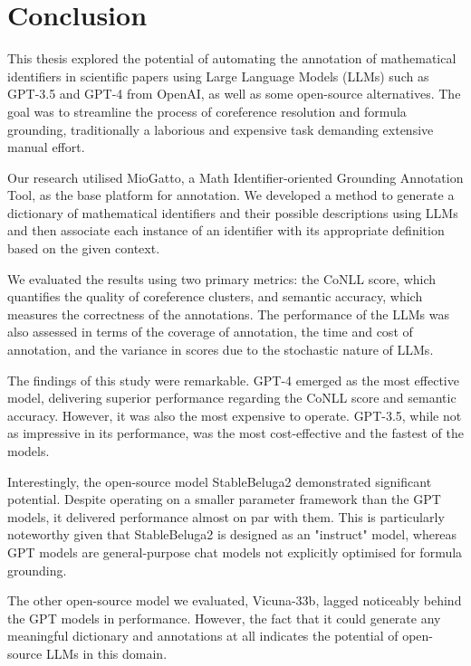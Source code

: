 \chapter{Conclusion}\label{chapter:conclusion}

This thesis explored the potential of automating the annotation of mathematical identifiers in scientific papers using Large Language Models (LLMs) such as GPT-3.5 and GPT-4 from OpenAI, as well as some open-source alternatives. The goal was to streamline the process of coreference resolution and formula grounding, traditionally a laborious and expensive task demanding extensive manual effort. 

Our research utilised MioGatto, a Math Identifier-oriented Grounding Annotation Tool, as the base platform for annotation. We developed a method to generate a dictionary of mathematical identifiers and their possible descriptions using LLMs and then associate each instance of an identifier with its appropriate definition based on the given context. 

We evaluated the results using two primary metrics: the CoNLL score, which quantifies the quality of coreference clusters, and semantic accuracy, which measures the correctness of the annotations. The performance of the LLMs was also assessed in terms of the coverage of annotation, the time and cost of annotation, and the variance in scores due to the stochastic nature of LLMs. 

The findings of this study were remarkable. GPT-4 emerged as the most effective model, delivering superior performance regarding the CoNLL score and semantic accuracy. However, it was also the most expensive to operate. GPT-3.5, while not as impressive in its performance, was the most cost-effective and the fastest of the models. 

Interestingly, the open-source model StableBeluga2 demonstrated significant potential. Despite operating on a smaller parameter framework than the GPT models, it delivered performance almost on par with them. This is particularly noteworthy given that StableBeluga2 is designed as an "instruct" model, whereas GPT models are general-purpose chat models not explicitly optimised for formula grounding. 

The other open-source model we evaluated, Vicuna-33b, lagged noticeably behind the GPT models in performance. However, the fact that it could generate any meaningful dictionary and annotations at all indicates the potential of open-source LLMs in this domain. 

